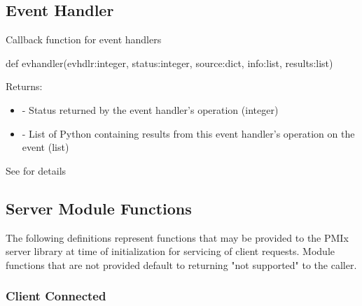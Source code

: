 \subsection{Event Handler}

\summary

Callback function for event handlers

\format

\pyspecificstart
\begin{codepar}
def evhandler(evhdlr:integer, status:integer,
              source:dict, info:list, results:list)
\end{codepar}
\pyspecificend

\begin{arglist}
\end{arglist}

Returns:
\begin{itemize}
    \item {} - Status returned by the event handler's operation (integer)
    \item {} - List of Python  containing results from this event handler's operation on the event (list)
\end{itemize}

See  for details


\subsection{Server Module Functions}

The following definitions represent functions that may be provided to the \ac{PMIx} server library at time of initialization for servicing of client requests. Module functions that are not provided default to returning "not supported" to the caller.

\subsubsection{Client Connected}

